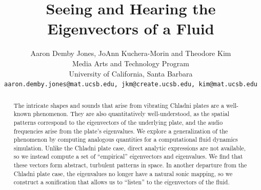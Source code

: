\documentclass[11pt]{article}
\title{Seeing and Hearing the Eigenvectors of a Fluid}
\author{ Aaron Demby Jones, JoAnn Kuchera-Morin and Theodore Kim\\
Media Arts and Technology Program\\ University of California, Santa Barbara\\
{\tt aaron.demby.jones@mat.ucsb.edu, jkm@create.ucsb.edu, kim@mat.ucsb.edu}
}
\date{}				%
\begin{document}
\newcommand{\UU}{\mathbf{U}}
\newcommand{\truncU}{\mathbf{U}_{\textnormal{trunc}}}
\newcommand{\uu}{\mathbf{u}}
\newcommand{\vv}{\mathbf{v}}
\newcommand{\xx}{\mathbf{x}}
\newcommand{\utilde}{\mathbf{q}}
\newcommand{\ff}{\mathbf{f}}
\newcommand{\qq}{\mathbf{q}}
\newcommand{\aaa}{\mathbf{a}}
\newcommand{\R}{\mathbb{R}}
\newcommand{\subspace}{\mathbb{S}}
\newcommand{\boldA}{\mathbf{A}}
\newcommand{\QQ}{\mathbf{Q}}
\newcommand{\boldX}{\mathbf{X}}
\newcommand{\VV}{\mathbf{V}}
\newcommand{\todo}[1]{$\spadesuit$ {\bf #1} $\spadesuit$}


\maketitle

\thispagestyle{empty}

\begin{abstract}
The intricate shapes and sounds that arise from vibrating Chladni plates are a well-known phenomenon. They are also quantitatively well-understood, as the spatial patterns correspond to the eigenvectors of the underlying plate, and the audio frequencies arise from the plate's eigenvalues. We explore a generalization of the phenomenon by computing analogous quantities for a computational fluid dynamics simulation. Unlike the Chladni plate case, direct analytic expressions are not available, so we instead compute a set of ``empirical'' eigenvectors and eigenvalues. We find that these vectors form abstract, turbulent patterns in space. In another departure from the Chladni plate case, the eigenvalues no longer have a natural sonic mapping, so we construct a sonification that allows us to ``listen'' to the eigenvectors of the fluid.
\end{abstract}

\end{document}

